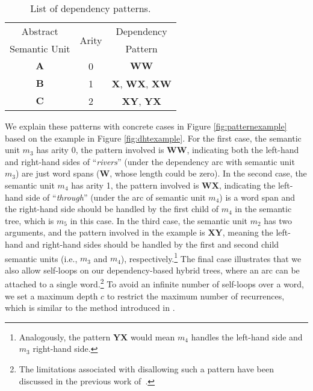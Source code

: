 \begin{table}[h!]
	\centering
	\begin{tabular}{ccc}
		\toprule
		Abstract & \multirow{2}{*}{Arity} &\multirow{1}{*}{Dependency} \\
		Semantic Unit & &   Pattern  \\\midrule 
		$\mathbf{A}$&0 & $\mathbf{WW}$ \\
		$\mathbf{B}$&1 & $\mathbf{X}$, $\mathbf{WX}$, $\mathbf{XW}$  \\
		$\mathbf{C}$&2 & $\mathbf{XY}$, $\mathbf{YX}$ \\
		\bottomrule
	\end{tabular}
	\caption{List of dependency patterns.}
	\label{tab:patterns}
\end{table}

We explain these patterns with concrete cases in Figure \ref{fig:patternexample} based on the example in Figure \ref{fig:dhtexample}.
For the first case, the semantic unit $m_3$ has arity 0, the pattern involved is $\mathbf{W}\mathbf{W}$, indicating both the left-hand and right-hand sides of ``{\em rivers}'' (under the dependency arc with semantic unit $m_3$) are just word spans ($\mathbf{W}$, whose length could be zero). 
In the second case, the semantic unit $m_4$ has arity 1, the pattern involved is $\mathbf{WX}$, indicating the left-hand side of ``{\em through}'' (under the arc of semantic unit $m_4$) is a word span  and the right-hand side should be handled by the first child of $m_4$ in the semantic tree, which is $m_5$ in this case.
In the third case, the semantic unit $m_2$ has two arguments, and the pattern involved in the example is $\mathbf{XY}$, meaning the left-hand and right-hand sides should be handled by the first and second child semantic units (i.e., $m_3$ and $m_4$), respectively.\footnote{Analogously, the pattern $\mathbf{YX}$ would mean $m_4$ handles the left-hand side and $m_3$ right-hand side.}
The final case illustrates that we also allow self-loops on our dependency-based hybrid trees, where an arc can be attached to a single word.\footnote{The limitations associated with disallowing such a pattern have been discussed in the previous work of~\cite{lu2015constrained}.} 
To avoid an infinite number of self-loops over a word, we set a maximum depth $c$ to restrict the maximum number of recurrences, which is similar to the method introduced in \cite{lu2015constrained}. 


